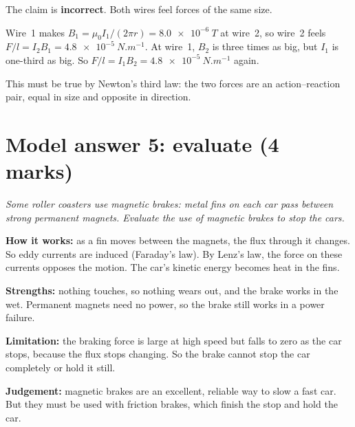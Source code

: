 \begin{modelanswer}
 The claim is \textbf{incorrect}. Both wires feel forces of the same size.

 Wire~1 makes $B_1 = \mu_0 I_1/(2\pi r) = \qty{8.0e-6}{T}$ at wire~2, so wire~2
feels $F/l = I_2B_1 = \qty{4.8e-5}{N.m^{-1}}$. At wire~1, $B_2$ is three times as big, but
$I_1$ is one-third as big. So $F/l = I_1B_2 = \qty{4.8e-5}{N.m^{-1}}$ again.

 This must be true by Newton's third law: the two forces are an action--reaction
pair, equal in size and opposite in direction.
\end{modelanswer}

\begin{markingcriteria}
\end{markingcriteria}

\section*{Model answer 5: evaluate (4 marks)}

\emph{Some roller coasters use magnetic brakes: metal fins on each car pass between strong
permanent magnets. Evaluate the use of magnetic brakes to stop the cars.}

\begin{modelanswer}
 \textbf{How it works:} as a fin moves between the magnets, the flux through it
changes. So eddy currents are induced (Faraday's law). By Lenz's law, the force on these
currents opposes the motion. The car's kinetic energy becomes heat in the fins.

 \textbf{Strengths:} nothing touches, so nothing wears out, and the brake works in
the wet. Permanent magnets need no power, so the brake still works in a power failure.

 \textbf{Limitation:} the braking force is large at high speed but falls to zero
as the car stops, because the flux stops changing. So the brake cannot stop the car
completely or hold it still.

 \textbf{Judgement:} magnetic brakes are an excellent, reliable way to slow a fast
car. But they must be used with friction brakes, which finish the stop and hold the car.
\end{modelanswer}

\begin{markingcriteria}
\end{markingcriteria}
